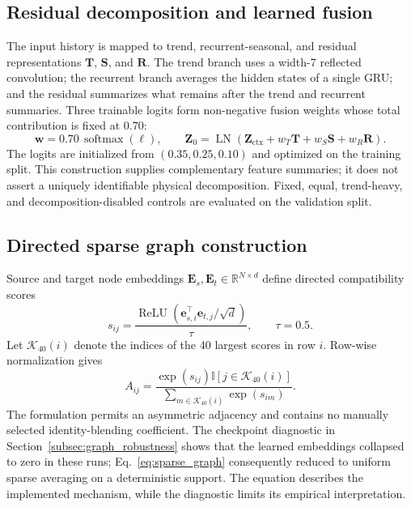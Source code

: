 \documentclass[fleqn,10pt]{wlscirep}
\newenvironment{changedcontent}{\color{changeblue}}{}
\begin{document}
\begin{changedcontent}
\subsection{Residual decomposition and learned fusion}
The input history is mapped to trend, recurrent-seasonal, and residual
representations $\mathbf{T}$, $\mathbf{S}$, and $\mathbf{R}$. The trend
branch uses a width-7 reflected convolution; the recurrent branch averages
the hidden states of a single GRU; and the residual summarizes what remains
after the trend and recurrent summaries. Three trainable logits form
non-negative fusion weights whose total contribution is fixed at 0.70:
\begin{equation}
\mathbf{w}=0.70\,\operatorname{softmax}(\boldsymbol{\ell}),\qquad
\mathbf{Z}_{0}=\operatorname{LN}\!\left(
\mathbf{Z}_{\mathrm{ctx}}+w_T\mathbf{T}+w_S\mathbf{S}+w_R\mathbf{R}
\right).
\label{eq:decomposition_fusion}
\end{equation}
The logits are initialized from $(0.35,0.25,0.10)$ and optimized on the
training split. This construction supplies complementary feature summaries;
it does not assert a uniquely identifiable physical decomposition. Fixed,
equal, trend-heavy, and decomposition-disabled controls are evaluated on the
validation split.

\subsection{Directed sparse graph construction}
Source and target node embeddings
$\mathbf{E}_{s},\mathbf{E}_{t}\in\mathbb{R}^{N\times d}$ define directed
compatibility scores
\begin{equation}
s_{ij}=\frac{\operatorname{ReLU}\!\left(
\mathbf{e}_{s,i}^{\top}\mathbf{e}_{t,j}/\sqrt{d}\right)}{\tau},
\qquad \tau=0.5.
\label{eq:graph_scores}
\end{equation}
Let $\mathcal{K}_{40}(i)$ denote the indices of the 40 largest scores in row
$i$. Row-wise normalization gives
\begin{equation}
A_{ij}=\frac{\exp(s_{ij})\mathbb{I}[j\in\mathcal{K}_{40}(i)]}
{\sum_{m\in\mathcal{K}_{40}(i)}\exp(s_{im})}.
\label{eq:sparse_graph}
\end{equation}
The formulation permits an asymmetric adjacency and contains no manually
selected identity-blending coefficient. The checkpoint diagnostic in
Section~\ref{subsec:graph_robustness} shows that the learned embeddings
collapsed to zero in these runs; Eq.~\eqref{eq:sparse_graph} consequently
reduced to uniform sparse averaging on a deterministic support. The equation
describes the implemented mechanism, while the diagnostic limits its
empirical interpretation.


\end{changedcontent}
\end{document}
